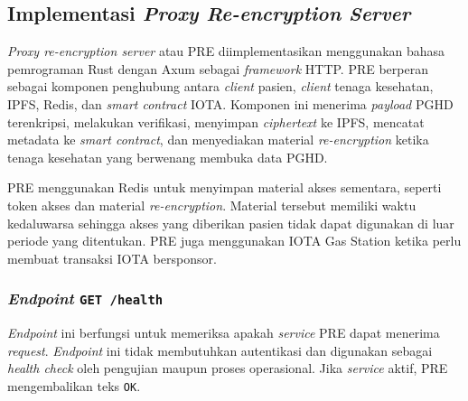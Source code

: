 
\subsection{Implementasi \textit{Proxy Re-encryption Server}}

\textit{Proxy re-encryption server} atau PRE diimplementasikan menggunakan bahasa pemrograman Rust dengan Axum sebagai \textit{framework} HTTP\@. 
PRE berperan sebagai komponen penghubung antara \textit{client} pasien, \textit{client} tenaga kesehatan, IPFS, Redis, dan \textit{smart contract} IOTA\@. 
Komponen ini menerima \textit{payload} PGHD terenkripsi, melakukan verifikasi, menyimpan \textit{ciphertext} ke IPFS, mencatat metadata ke \textit{smart contract}, dan menyediakan material \textit{re-encryption} ketika tenaga kesehatan yang berwenang membuka data PGHD\@.

PRE menggunakan Redis untuk menyimpan material akses sementara, seperti token akses dan material \textit{re-encryption}.
Material tersebut memiliki waktu kedaluwarsa sehingga akses yang diberikan pasien tidak dapat digunakan di luar periode yang ditentukan. 
PRE juga menggunakan IOTA Gas Station ketika perlu membuat transaksi IOTA bersponsor.




\subsubsection{\textit{Endpoint} \texttt{GET /health}}\label{subsubsec:pre-endpoint-health}

\textit{Endpoint} ini berfungsi untuk memeriksa apakah \textit{service} PRE dapat menerima \textit{request}. 
\textit{Endpoint} ini tidak membutuhkan autentikasi dan digunakan sebagai \textit{health check} oleh pengujian maupun proses operasional. 
Jika \textit{service} aktif, PRE mengembalikan teks \texttt{OK}.

